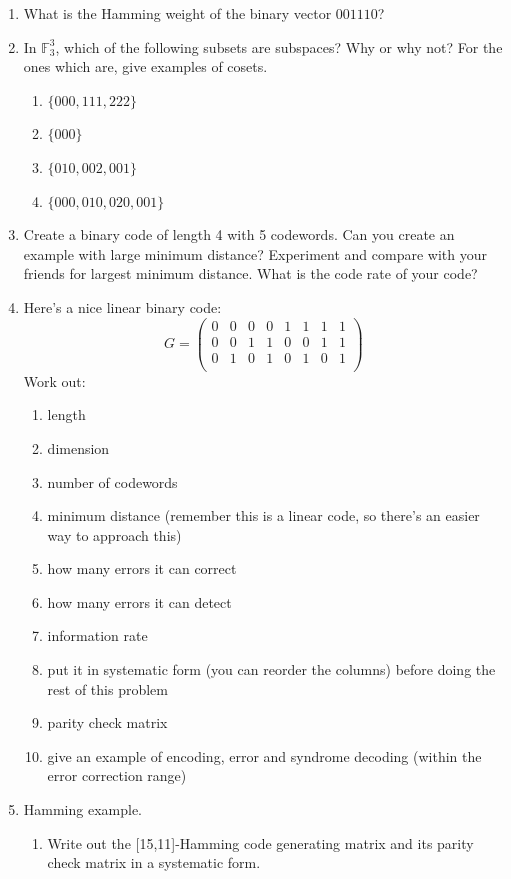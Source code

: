 \documentclass{article}
\theoremstyle{plain}
\theoremstyle{definition}
\theoremstyle{remark}
\numberwithin{theorem}{section}
\newcommand{\FF}{\mathbb{F}}
\begin{document}
\begin{enumerate}
\item What is the Hamming weight of the binary vector $001110$?
\item In $\FF_3^3$, which of the following subsets are subspaces?  Why or why not?  For the ones which are, give examples of cosets.
\begin{enumerate}
    \item $\{000,111,222\}$
    \item $\{000\}$
    \item $\{010,002,001\}$
    \item $\{000,010,020,001\}$
\end{enumerate}
\item Create a binary code of length 4 with 5 codewords.  Can you create an example with large minimum distance?  Experiment and compare with your friends for largest minimum distance.  What is the code rate of your code?
\item Here's a nice linear binary code:
\[
G=
\begin{pmatrix}
    0 & 0 & 0 & 0 & 1 & 1 & 1 & 1 \\
    0 & 0 & 1 & 1 & 0 & 0 & 1 & 1 \\
    0 & 1 & 0 & 1 & 0 & 1 & 0 & 1 \\
\end{pmatrix}
\]
Work out:
\begin{enumerate}
    \item length
    \item dimension
    \item number of codewords
        \item minimum distance (remember this is a linear code, so there's an easier way to approach this)
            \item how many errors it can correct
    \item how many errors it can detect
        \item information rate
    \item put it in systematic form (you can reorder the columns) before doing the rest of this problem
    \item parity check matrix
    \item give an example of encoding, error and syndrome decoding (within the error correction range)
\end{enumerate}
    \item Hamming example.
    \begin{enumerate}
        \item Write out the [15,11]-Hamming code generating matrix and its parity check matrix in a systematic form.  

\end{enumerate}
\end{enumerate}
\end{document}
